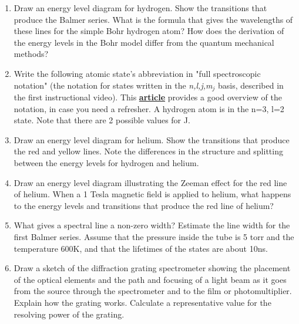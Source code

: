 \documentclass{../signatures}
\begin{document}
\maketitle

\names

\prelab

\begin{enumerate}

    \item Draw an energy level diagram for hydrogen. Show the transitions that produce the Balmer series. What is the formula that gives the wavelengths of these lines for the simple Bohr hydrogen atom? How does the derivation of the energy levels in the Bohr model differ from the quantum mechanical methods?
    
    \item Write the following atomic state's abbreviation in "full spectroscopic notation" (the notation for states written in the \emph{n,l,j,m$_j$} basis, described in the first instructional video). This \href{http://www.physics.byu.edu/faculty/bergeson/physics571/notes/L27spectnotation.pdf}{\textbf{article}} provides a good overview of the notation, in case you need a refresher. A hydrogen atom is in the n=3, l=2 state. Note that there are 2 possible values for J. 

    \item Draw an energy level diagram for helium. Show the transitions that produce the red and yellow lines. Note the differences in the structure and splitting between the energy levels for hydrogen and helium.

    \item Draw an energy level diagram illustrating the Zeeman effect for the red line of helium. When a 1 Tesla magnetic field is applied to helium, what happens to the energy levels and transitions that produce the red line of helium?

    \item What gives a spectral line a non-zero width? Estimate the line width for the first Balmer series. Assume that the pressure inside the tube is 5 torr and the temperature 600K, and that the lifetimes of the states are about 10ns.

    \item Draw a sketch of the diffraction grating spectrometer showing the placement of the optical elements and the path and focusing of a light beam as it goes from the source through the spectrometer and to the film or photomultiplier. Explain how the grating works. Calculate a representative value for the resolving power of the grating.


\end{enumerate}
\end{document}
